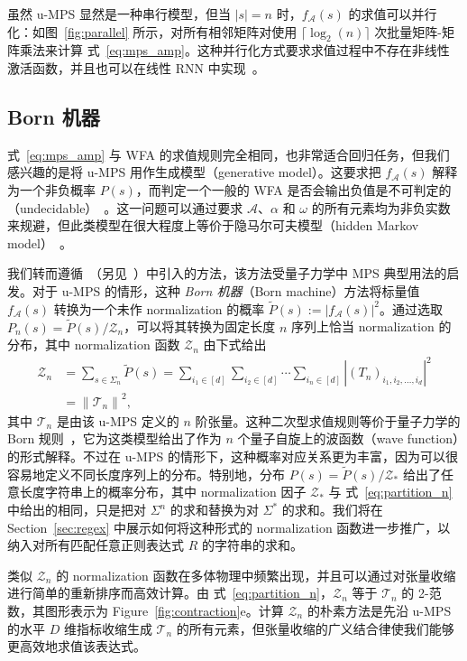 \documentclass[twoside]{article}
\newcommand{\eqnref}[1]{式~\ref{#1}}
\newcommand{\Z}{\mc{Z}}
\newcommand{\Pt}{\tilde{P}}
\newcommand{\mc}[1]{\mathcal{#1}}
\begin{document}
虽然 u-MPS 显然是一种串行模型，但当 $|s| = n$ 时，$f_{\mc{A}}(s)$ 的求值可以并行化：如图~\ref{fig:parallel} 所示，对所有相邻矩阵对使用 $\lceil \log_2(n) \rceil$ 次批量矩阵-矩阵乘法来计算 \eqnref{eq:mps_amp}。这种并行化方式要求求值过程中不存在非线性激活函数，并且也可以在线性 RNN 中实现~\citep{martin2018}。

\subsection{Born 机器}

\eqnref{eq:mps_amp} 与 WFA 的求值规则完全相同，也非常适合回归任务，但我们感兴趣的是将 u-MPS 用作生成模型（generative model）。这要求把 $f_{\mc{A}}(s)$ 解释为一个非负概率 $P(s)$，而判定一个一般的 WFA 是否会输出负值是不可判定的（undecidable）~\citep{denis2008}。这一问题可以通过要求 $\mc{A}$、$\alpha$ 和 $\omega$ 的所有元素均为非负实数来规避，但此类模型在很大程度上等价于隐马尔可夫模型（hidden Markov model）~\citep{denis2008}。

我们转而遵循~\citep{pestun2017a}（另见~\citep{han2018}）中引入的方法，该方法受量子力学中 MPS 典型用法的启发。对于 u-MPS 的情形，这种 \emph{Born 机器}（Born machine）方法将标量值 $f_{\mc{A}}(s)$ 转换为一个未作 normalization 的概率 $\Pt(s) := \left|f_{\mc{A}}(s)\right|^2$。通过选取 $P_n(s) = \Pt(s) / \Z_n$，可以将其转换为固定长度 $n$ 序列上恰当 normalization 的分布，其中 normalization 函数 $\Z_n$ 由下式给出
%
\begin{align}
\label{eq:partition_n}
\Z_n &= \sum_{s \in \Sigma_n} \Pt(s) = \sum_{i_1\in[d]} \sum_{i_2\in[d]} \cdots \sum_{i_n\in[d]} \left| (T_n)_{i_1,i_2,\ldots,i_d} \right|^2 \nonumber\\
&= \left\lVert\mc{T}_n\right\rVert^2,
\end{align}
%
其中 $\mc{T}_n$ 是由该 u-MPS 定义的 $n$ 阶张量。这种二次型求值规则等价于量子力学的 Born 规则~\citep{born1926}，它为这类模型给出了作为 $n$ 个量子自旋上的波函数（wave function）的形式解释。不过在 u-MPS 的情形下，这种概率对应关系更为丰富，因为可以很容易地定义不同长度序列上的分布。特别地，分布 $P(s) = \Pt(s) / \Z_*$ 给出了任意长度字符串上的概率分布，其中 normalization 因子 $\Z_*$ 与 \eqnref{eq:partition_n} 中给出的相同，只是把对 $\Sigma^n$ 的求和替换为对 $\Sigma^*$ 的求和。我们将在 Section~\ref{sec:regex} 中展示如何将这种形式的 normalization 函数进一步推广，以纳入对所有匹配任意正则表达式 $R$ 的字符串的求和。

类似 $\Z_n$ 的 normalization 函数在多体物理中频繁出现，并且可以通过对张量收缩进行简单的重新排序而高效计算。由 \eqnref{eq:partition_n}，$\Z_n$ 等于 $\mc{T}_n$ 的 2-范数，其图形表示为 Figure~\ref{fig:contraction}e。计算 $\Z_n$ 的朴素方法是先沿 u-MPS 的水平 $D$ 维指标收缩生成 $\mc{T}_n$ 的所有元素，但张量收缩的广义结合律使我们能够更高效地求值该表达式。
\end{document}
